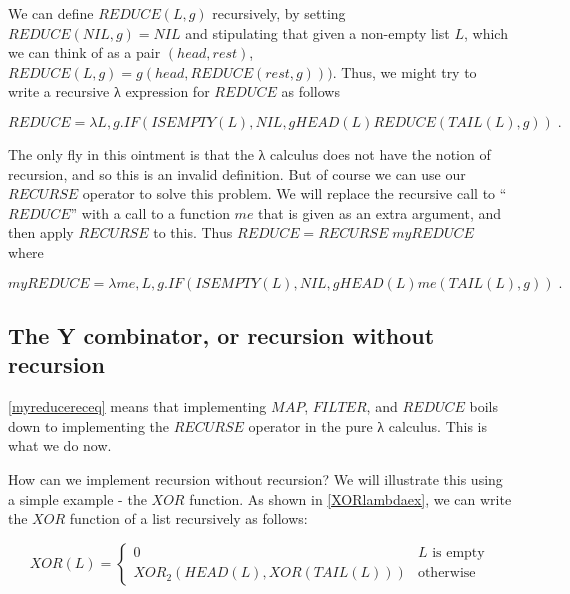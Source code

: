 We can define \(\ensuremath{\mathit{REDUCE}}(L,g)\) recursively, by
setting
\(\ensuremath{\mathit{REDUCE}}(\ensuremath{\mathit{NIL}},g)=\ensuremath{\mathit{NIL}}\)
and stipulating that given a non-empty list \(L\), which we can think of
as a pair \((head,rest)\),
\(\ensuremath{\mathit{REDUCE}}(L,g) = g(head, \ensuremath{\mathit{REDUCE}}(rest,g)))\).
Thus, we might try to write a recursive λ expression for
\(\ensuremath{\mathit{REDUCE}}\) as follows

\[
\ensuremath{\mathit{REDUCE}} = \lambda L,g. \ensuremath{\mathit{IF}}(\ensuremath{\mathit{ISEMPTY}}(L),\ensuremath{\mathit{NIL}},g \ensuremath{\mathit{HEAD}}(L) \ensuremath{\mathit{REDUCE}}(\ensuremath{\mathit{TAIL}}(L),g)) \label{reducereceq} \;.
\]

The only fly in this ointment is that the λ calculus does not have the
notion of recursion, and so this is an invalid definition. But of course
we can use our \(\ensuremath{\mathit{RECURSE}}\) operator to solve this
problem. We will replace the recursive call to
``\(\ensuremath{\mathit{REDUCE}}\)'' with a call to a function \(me\)
that is given as an extra argument, and then apply
\(\ensuremath{\mathit{RECURSE}}\) to this. Thus
\(\ensuremath{\mathit{REDUCE}} = \ensuremath{\mathit{RECURSE}}\;myREDUCE\)
where

\[
myREDUCE = \lambda me,L,g. \ensuremath{\mathit{IF}}(\ensuremath{\mathit{ISEMPTY}}(L),\ensuremath{\mathit{NIL}},g \ensuremath{\mathit{HEAD}}(L) me(\ensuremath{\mathit{TAIL}}(L),g)) \label{myreducereceq} \;.
\]

\subsection{The Y combinator, or recursion without
recursion}\label{ycombinatorsec}

\cref{myreducereceq} means that implementing
\(\ensuremath{\mathit{MAP}}\), \(\ensuremath{\mathit{FILTER}}\), and
\(\ensuremath{\mathit{REDUCE}}\) boils down to implementing the
\(\ensuremath{\mathit{RECURSE}}\) operator in the pure λ calculus. This
is what we do now.

How can we implement recursion without recursion? We will illustrate
this using a simple example - the \(\ensuremath{\mathit{XOR}}\)
function. As shown in \cref{XORlambdaex}, we can write the
\(\ensuremath{\mathit{XOR}}\) function of a list recursively as follows:

\[
\ensuremath{\mathit{XOR}}(L) = \begin{cases} 0 & L \text{ is empty} \\ \ensuremath{\mathit{XOR}}_2(\ensuremath{\mathit{HEAD}}(L),\ensuremath{\mathit{XOR}}(\ensuremath{\mathit{TAIL}}(L))) & \text{otherwise}
\end{cases}
\]

